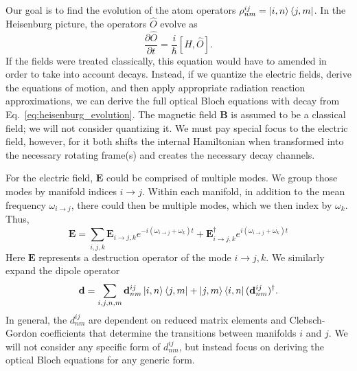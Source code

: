 \documentclass[final,5p,times,twocolumn]{elsarticle}
\begin{document}
Our goal is to find the evolution of the atom operators $\rho^{ij}_{nm} = \ket{i, n}\Bra{j, m}$.   In the Heisenburg picture, the operators $\hat{O}$ evolve as
\begin{equation}
	\label{eq:heisenburg_evolution}
	\frac{\partial \hat{O}}{\partial t}  = \frac{i}{\hbar}[\hat{H}, \hat{O}].
\end{equation}
If the fields were treated classically, this equation would have to amended in order to take into account decays.  Instead, if we quantize the electric fields, derive the equations of motion, and then apply appropriate radiation reaction approximations, we can derive the full optical Bloch equations with decay from Eq.~\ref{eq:heisenburg_evolution}.  The magnetic field $\mathbf{B}$ is assumed to be a classical field; we will not consider quantizing it.  We must pay special focus to the electric field, however, for it both shifts the internal Hamiltonian when transformed into the necessary rotating frame(s) and creates the necessary decay channels.

For the electric field, $\mathbf{E}$ could be comprised of multiple modes.  We group those modes by manifold indices $i\rightarrow j$.  Within each manifold, in addition to the mean frequency $\omega_{i\rightarrow j}$, there could then be multiple modes, which we then index by $\omega_k$.  Thus,
\begin{equation}
	\mathbf{E} = \sum_{i, j, k} \mathbf{E}_{i\rightarrow j, k} e^{-i (\omega_{i\rightarrow j} +\omega_k) t} + \mathbf{E}_{i\rightarrow j, k}^\dagger e^{i (\omega_{i\rightarrow j} +\omega_k) t}
\end{equation}
Here $\mathbf{E}$ represents a destruction operator of the mode $i\rightarrow j, k$.  We similarly expand the dipole operator
\begin{equation}
	\mathbf{d} = \sum_{i,j,n,m}\mathbf{d}^{ij}_{nm}\ket{i,n}\Bra{j,m} + \ket{j,m}\Bra{i,n}(\mathbf{d}^{ij}_{nm})^\dagger .
\end{equation}
In general, the ${d}^{ij}_{nm}$ are dependent on reduced matrix elements and Clebsch-Gordon coefficients that determine the transitions between manifolds $i$ and $j$.  We will not consider any specific form of $d^{ij}_{nm}$, but instead focus on deriving the optical Bloch equations for any generic form.
\end{document}
